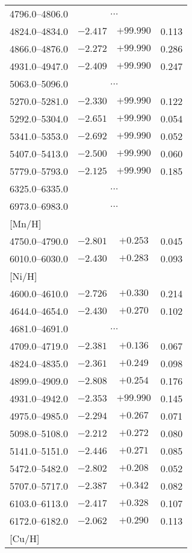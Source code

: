 \documentclass{aa}
\begin{document}
\begin{appendix}
\begin{table}
{\begin{tabular}{lccc}
4796.0--4806.0 & \multicolumn{2}{c}{$\ldots$} \\
4824.0--4834.0 & $-2.417$ & $+99.990$ & 0.113\\
4866.0--4876.0 & $-2.272$ & $+99.990$ & 0.286\\
4931.0--4947.0 & $-2.409$ & $+99.990$ & 0.247\\
5063.0--5096.0 & \multicolumn{2}{c}{$\ldots$} \\
5270.0--5281.0 & $-2.330$ & $+99.990$ & 0.122\\
5292.0--5304.0 & $-2.651$ & $+99.990$ & 0.054\\
5341.0--5353.0 & $-2.692$ & $+99.990$ & 0.052\\
5407.0--5413.0 & $-2.500$ & $+99.990$ & 0.060\\
5779.0--5793.0 & $-2.125$ & $+99.990$ & 0.185\\
6325.0--6335.0 & \multicolumn{2}{c}{$\ldots$} \\
6973.0--6983.0 & \multicolumn{2}{c}{$\ldots$} \\
\mbox{[Mn/H]} \\
4750.0--4790.0 & $-2.801$ & $+0.253$ & 0.045\\
6010.0--6030.0 & $-2.430$ & $+0.283$ & 0.093\\
\mbox{[Ni/H]} \\
4600.0--4610.0 & $-2.726$ & $+0.330$ & 0.214\\
4644.0--4654.0 & $-2.430$ & $+0.270$ & 0.102\\
4681.0--4691.0 & \multicolumn{2}{c}{$\ldots$} \\
4709.0--4719.0 & $-2.381$ & $+0.136$ & 0.067\\
4824.0--4835.0 & $-2.361$ & $+0.249$ & 0.098\\
4899.0--4909.0 & $-2.808$ & $+0.254$ & 0.176\\
4931.0--4942.0 & $-2.353$ & $+99.990$ & 0.145\\
4975.0--4985.0 & $-2.294$ & $+0.267$ & 0.071\\
5098.0--5108.0 & $-2.212$ & $+0.272$ & 0.080\\
5141.0--5151.0 & $-2.446$ & $+0.271$ & 0.085\\
5472.0--5482.0 & $-2.802$ & $+0.208$ & 0.052\\
5707.0--5717.0 & $-2.387$ & $+0.342$ & 0.082\\
6103.0--6113.0 & $-2.417$ & $+0.328$ & 0.107\\
6172.0--6182.0 & $-2.062$ & $+0.290$ & 0.113\\
\mbox{[Cu/H]} \\

\end{tabular}}
\end{table}
\end{appendix}
\end{document}
